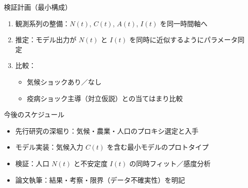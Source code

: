 \documentclass[aspectratio=169,11pt]{beamer}
\begin{document}
\begin{frame}{検証計画（最小構成）}
  \begin{enumerate}
    \item 観測系列の整備：$N(t)$, $C(t)$, $A(t)$, $I(t)$ を同一時間軸へ
    \item 推定：モデル出力が $N(t)$ と $I(t)$ を同時に近似するようにパラメータ同定
    \item 比較：
      \begin{itemize}
        \item 気候ショックあり／なし
        \item 疫病ショック主導（対立仮説）との当てはまり比較
      \end{itemize}
  \end{enumerate}
\end{frame}


  \vspace{0.6em}

\begin{frame}{今後のスケジュール}
  \begin{itemize}
    \item 先行研究の深堀り：気候・農業・人口のプロキシ選定と入手
    \item モデル実装：気候入力 $C(t)$ を含む最小モデルのプロトタイプ
    \item 検証：人口 $N(t)$ と不安定度 $I(t)$ の同時フィット／感度分析
    \item 論文執筆：結果・考察・限界（データ不確実性）を明記
  \end{itemize}
\end{frame}
\end{document}
